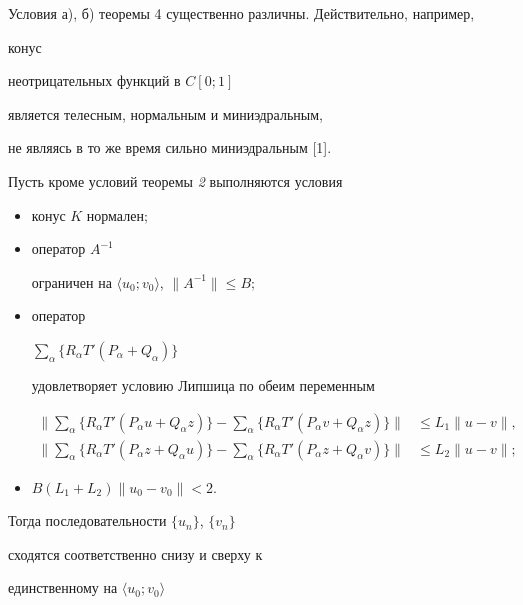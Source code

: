 Условия а), б) теоремы 4 существенно различны. Действительно, например,


конус


неотрицательных функций в $C[0;1]$


является телесным, нормальным и миниэдральным,


не являясь в то же время сильно миниэдральным [1].





\begin{thm} Пусть кроме условий теоремы {\em 2} выполняются условия


\begin{itemize}


\item[1)] конус $K$ нормален$;$


\item[2)] оператор $A^{-1}$


ограничен на $\langle u_0;v_0\rangle$, $\|A^{-1}\|\le B;$


\item[3)] оператор


$\sum\limits_\alpha\{R_\alpha T'(P_\alpha+Q_\alpha)\}$


удовлетворяет условию Липшица по обеим переменным


\begin{align*}


\biggl\|\sum_\alpha\{R_\alpha T'(P_\alpha u+Q_\alpha z)\}-


\sum_\alpha\{R_\alpha T'(P_\alpha v+Q_\alpha z)\}\biggr\|


&\le L_1\|u-v\|,\\


\biggl\|\sum_\alpha\{R_\alpha T'(P_\alpha z+Q_\alpha u)\}-


\sum_\alpha\{R_\alpha T'(P_\alpha z+Q_\alpha v)\}\biggr\|


&\le L_2\|u-v\|;


\end{align*}


\item[4)] $B(L_1+L_2)\|u_0-v_0\|<2$.


\end{itemize}





Тогда последовательности $\{u_n\}$, $\{v_n\}$


сходятся соответственно снизу и сверху к


единственному на $\langle u_0;v_0\rangle$



\end{thm}
